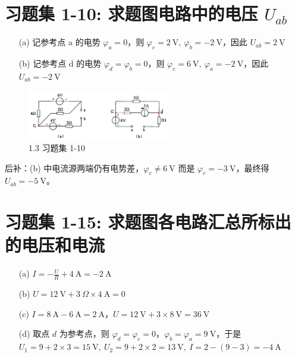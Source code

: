 \documentclass[UTF8]{report}
\theoremstyle{MyLineTheoremStyle} %
\theoremstyle{MyBlockTheoremStyle} %
\theoremstyle{MySubsubsectionStyle} %
\begin{document}
\section{习题集 1-10: 求题图电路中的电压 $U_{ab}$}



\begin{enumerate}
\item[(a)] 
记参考点 a 的电势 $\varphi_a=0$，则 $\varphi_c = 2\ \mathrm{V} ,\ \varphi_b = -2\ \mathrm{V}$，因此 $U_{ab} = 2\ \mathrm{V}$

\item[(b)] 
记参考点 d 的电势 $\varphi_d = \varphi_b =0$，则 $\varphi_c = 6\ \mathrm{V},\ \varphi_a = -2\ \mathrm{V}$，因此 $U_{ab} = -2\ \mathrm{V}$

\end{enumerate}

\begin{figure}[H]\centering
\includegraphics[width=0.55\textwidth]{assets/1/9dda9e5f333b8cb7f498d15c015e5fd0.png}
\caption{ 1.3 习题集 1-10}
\end{figure}
{\par\color{gray}\small
后补：(b) 中电流源两端仍有电势差，$\varphi_c \ne 6 \ \mathrm{V}$ 而是 $ \varphi_c = -3\ \mathrm{V} $，最终得 $U_{ab} = -5 \ \mathrm{V}$。
\par}


\section{习题集 1-15: 求题图各电路汇总所标出的电压和电流}

\begin{enumerate}
    \item[(a)] $I = -\frac{U}{R} + 4\ \mathrm{A} = -2 \ \mathrm{A}$
    \item[(b)] $U =12 \ \mathrm{V} + 3\ \Omega \times 4 \ \mathrm{A} = 0 $ 
    \item[(c)] $I = 8 \ \mathrm{A} - 6\ \mathrm{A} = 2 \ \mathrm{A}$，$ U = 12 \ \mathrm{V} + 3\times8 \ \mathrm{V} = 36 \ \mathrm{V}$ 
    \item[(d)] 取点 $ d $ 为参考点，则 $\varphi_d = \varphi_c = 0$，$\varphi_b = \varphi_a = 9 \ \mathrm{V}$，于是 $U_1 = 9 + 2\times3 = 15\ \mathrm{V},\ U_2 = 9 + 2\times 2 = 13 \ \mathrm{V},\ I =2 -  (9-3) = - 4 \ \mathrm{A}$
\end{enumerate}
\end{document}

